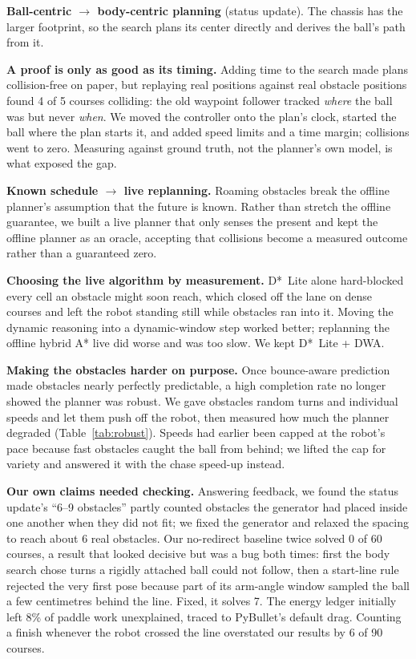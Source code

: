 \documentclass[10pt,twocolumn]{article}
\begin{document}
\textbf{Ball-centric $\rightarrow$ body-centric planning} (status
update). The chassis has the larger footprint, so the search plans its
center directly and derives the ball's path from it.

\textbf{A proof is only as good as its timing.} Adding time to the
search made plans collision-free on paper, but replaying real positions
against real obstacle positions found 4 of 5 courses colliding: the old
waypoint follower tracked \emph{where} the ball was but never \emph{when}.
We moved the controller onto the plan's clock, started the ball where the
plan starts it, and added speed limits and a time margin; collisions went
to zero. Measuring against ground truth, not the planner's own model, is
what exposed the gap.

\textbf{Known schedule $\rightarrow$ live replanning.} Roaming obstacles
break the offline planner's assumption that the future is known. Rather
than stretch the offline guarantee, we built a live planner that only
senses the present and kept the offline planner as an oracle, accepting
that collisions become a measured outcome rather than a guaranteed zero.

\textbf{Choosing the live algorithm by measurement.} D*~Lite alone
\cite{koenig2002} hard-blocked every cell an obstacle might soon reach,
which closed off the lane on dense courses and left the robot standing
still while obstacles ran into it. Moving the dynamic reasoning into a
dynamic-window step \cite{fox1997} worked better; replanning the offline
hybrid A* \cite{dolgov2010} live did worse and was too slow. We kept
D*~Lite + DWA.

\textbf{Making the obstacles harder on purpose.} Once bounce-aware
prediction made obstacles nearly perfectly predictable, a high completion
rate no longer showed the planner was robust. We gave obstacles random
turns and individual speeds and let them push off the robot, then measured
how much the planner degraded (Table~\ref{tab:robust}). Speeds had earlier
been capped at the robot's pace because fast obstacles caught the ball
from behind; we lifted the cap for variety and answered it with the chase
speed-up instead.

\textbf{Our own claims needed checking.} Answering feedback, we found the
status update's ``6--9 obstacles'' partly counted obstacles the generator
had placed inside one another when they did not fit; we fixed the
generator and relaxed the spacing to reach about 6 real obstacles. Our
no-redirect baseline twice solved 0 of 60 courses, a result that looked
decisive but was a bug both times: first the body search chose turns a
rigidly attached ball could not follow, then a start-line rule rejected the
very first pose because part of its arm-angle window sampled the ball a
few centimetres behind the line. Fixed, it solves 7. The energy ledger
initially left 8\% of paddle work unexplained, traced to PyBullet's
default drag. Counting a finish whenever the robot crossed the line
overstated our results by 6 of 90 courses.
\end{document}
